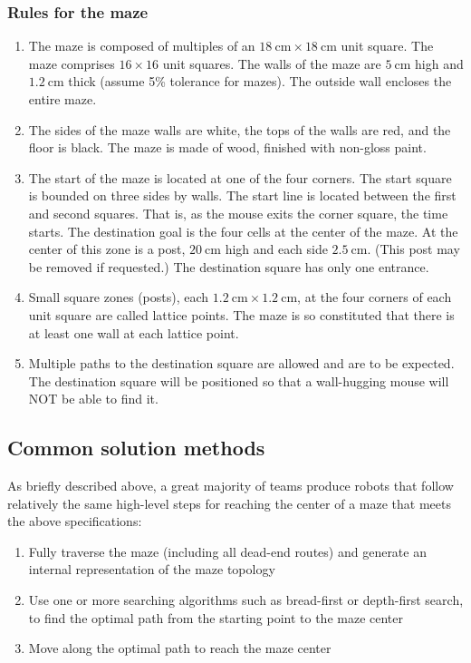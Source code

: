 \documentclass[10pt,twocolumn,letterpaper]{article}
\begin{document}
\subsubsection{Rules for the maze}
\label{ssub:mazerules}
\begin{enumerate}
	\item The maze is composed of multiples of an $18\ \textrm{cm} \times 18\ \textrm{cm}$ unit square. The maze
       comprises $16 \times 16$ unit squares. The walls of the maze are $5\ \textrm{cm}$ high and $1.2\ \textrm{cm}$
       thick (assume 5\% tolerance for mazes). The outside wall encloses the entire maze.
	\item The sides of the maze walls are white, the tops of the walls are red, and the floor is black. The maze is made
       of wood, finished with non-gloss paint.
	\item The start of the maze is located at one of the four corners. The start square is bounded on three sides by
       walls. The start line is located between the first and second squares. That is, as the mouse exits the corner
       square, the time starts. The destination goal is the four cells at the center of the maze. At the center of this
       zone is a post, $20\ \textrm{cm}$ high and each side $2.5\ \textrm{cm}$. (This post may be removed if requested.)
       The destination square has only one entrance.
	\item Small square zones (posts), each $1.2\ \textrm{cm} \times 1.2\ \textrm{cm}$, at the four corners of each unit
       square are called lattice points. The maze is so constituted that there is at least one wall at each lattice
       point.
	\item Multiple paths to the destination square are allowed and are to be expected. The destination square will be
       positioned so that a wall-hugging mouse will NOT be able to find it.
\end{enumerate}

\subsection{Common solution methods}
\label{sub:solutionmethods}
As briefly described above, a great majority of teams produce robots that follow relatively the same high-level steps
for reaching the center of a maze that meets the above specifications:

\begin{enumerate}
	\item Fully traverse the maze (including all dead-end routes) and generate an internal representation of the maze
	topology
	\item Use one or more searching algorithms such as bread-first or depth-first search, to find the optimal path from
	the starting point to the maze center
	\item Move along the optimal path to reach the maze center
\end{enumerate}
\end{document}
